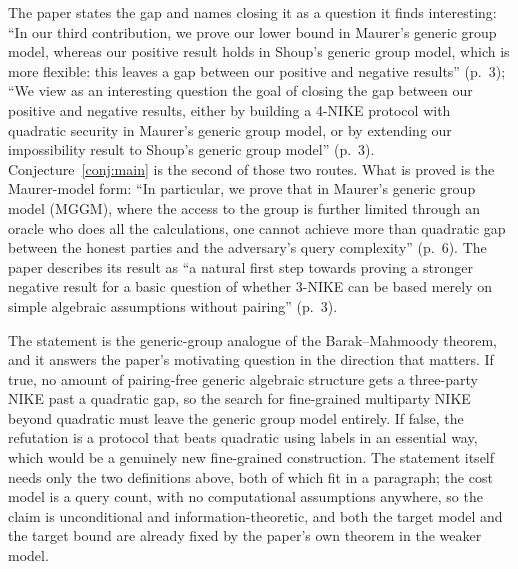 \documentclass{aicr-conjecture}
\begin{document}
\begin{remark}[Openness]\label{rem:open}
The paper states the gap and names closing it as a question it finds
interesting: ``In our third contribution, we prove our lower bound in
Maurer's generic group model, whereas our positive result holds in
Shoup's generic group model, which is more flexible: this leaves a gap
between our positive and negative results'' (p.~3); ``We view as an
interesting question the goal of closing the gap between our positive
and negative results, either by building a 4-NIKE protocol with
quadratic security in Maurer's generic group model, or by extending our
impossibility result to Shoup's generic group model'' (p.~3).
Conjecture~\ref{conj:main} is the second of those two routes. What is
proved is the Maurer-model form: ``In particular, we prove that in
Maurer's generic group model (MGGM), where the access to the group is
further limited through an oracle who does all the calculations, one
cannot achieve more than quadratic gap between the honest parties and
the adversary's query complexity'' (p.~6). The paper describes its
result as ``a natural first step towards proving a stronger negative
result for a basic question of whether 3-NIKE can be based merely on
simple algebraic assumptions without pairing'' (p.~3).
\end{remark}

\begin{remark}\label{rem:why}
The statement is the generic-group analogue of the Barak--Mahmoody
theorem, and it answers the paper's motivating question in the direction
that matters. If true, no amount of pairing-free generic algebraic
structure gets a three-party NIKE past a quadratic gap, so the search
for fine-grained multiparty NIKE beyond quadratic must leave the generic
group model entirely. If false, the refutation is a protocol that beats
quadratic using labels in an essential way, which would be a genuinely
new fine-grained construction. The statement itself needs only the two
definitions above, both of which fit in a paragraph; the cost model is a
query count, with no computational assumptions anywhere, so the claim is
unconditional and information-theoretic, and both the target model and
the target bound are already fixed by the paper's own theorem in the
weaker model.
\end{remark}
\end{document}

